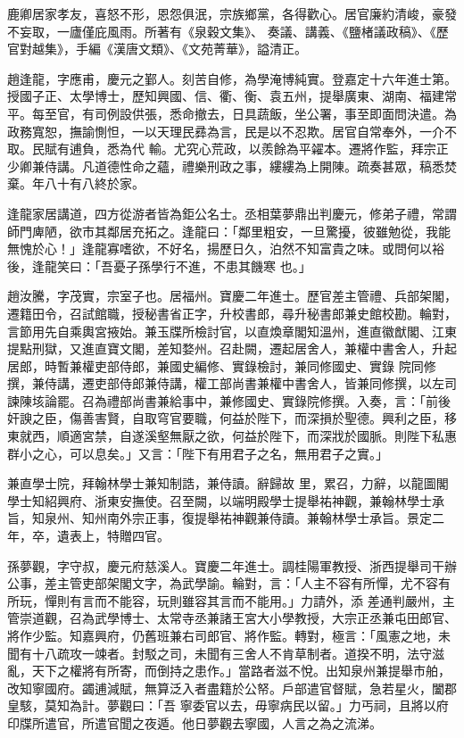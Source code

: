 \begin{pinyinscope}
 鹿卿居家孝友，喜怒不形，恩怨俱泯，宗族鄉黨，各得歡心。居官廉約清峻，豪發不妄取，一廬僅庇風雨。所著有《泉穀文集》、
 奏議、講義、《鹽楮議政稿》、《歷官對越集》，手編《漢唐文類》、《文苑菁華》，謚清正。



 趙逢龍，字應甫，慶元之鄞人。刻苦自修，為學淹博純實。登嘉定十六年進士第。授國子正、太學博士，歷知興國、信、衢、衡、袁五州，提舉廣東、湖南、福建常平。每至官，有司例設供張，悉命撤去，日具蔬飯，坐公署，事至即面問決遣。為政務寬恕，撫諭惻怛，一以天理民彞為言，民是以不忍欺。居官自常奉外，一介不取。民賦有逋負，悉為代
 輸。尤究心荒政，以羨餘為平糴本。遷將作監，拜宗正少卿兼侍講。凡道德性命之蘊，禮樂刑政之事，縷縷為上開陳。疏奏甚眾，稿悉焚棄。年八十有八終於家。



 逢龍家居講道，四方從游者皆為鉅公名士。丞相葉夢鼎出判慶元，修弟子禮，常謂師門庳陋，欲市其鄰居充拓之。逢龍曰：「鄰里粗安，一旦驚擾，彼雖勉從，我能無愧於心！」逢龍寡嗜欲，不好名，揚歷日久，泊然不知富貴之味。或問何以裕後，逢龍笑曰：「吾憂子孫學行不進，不患其饑寒
 也。」



 趙汝騰，字茂實，宗室子也。居福州。寶慶二年進士。歷官差主管禮、兵部架閣，遷籍田令，召試館職，授秘書省正字，升校書郎，尋升秘書郎兼史館校勘。輪對，言節用先自乘輿宮掖始。兼玉牒所檢討官，以直煥章閣知溫州，進直徽猷閣、江東提點刑獄，又進直寶文閣，差知婺州。召赴闕，遷起居舍人，兼權中書舍人，升起居郎，時暫兼權吏部侍郎，兼國史編修、實錄檢討，兼同修國史、實錄
 院同修撰，兼侍講，遷吏部侍郎兼侍講，權工部尚書兼權中書舍人，皆兼同修撰，以左司諫陳垓論罷。召為禮部尚書兼給事中，兼修國史、實錄院修撰。入奏，言：「前後奸諛之臣，傷善害賢，自取穹官要職，何益於陛下，而深損於聖德。興利之臣，移東就西，順適宮禁，自遂溪壑無厭之欲，何益於陛下，而深戕於國脈。則陛下私惠群小之心，可以息矣。」又言：「陛下有用君子之名，無用君子之實。」



 兼直學士院，拜翰林學士兼知制誥，兼侍讀。辭歸故
 里，累召，力辭，以龍圖閣學士知紹興府、浙東安撫使。召至闕，以端明殿學士提舉祐神觀，兼翰林學士承旨，知泉州、知州南外宗正事，復提舉祐神觀兼侍讀。兼翰林學士承旨。景定二年，卒，遺表上，特贈四官。



 孫夢觀，字守叔，慶元府慈溪人。寶慶二年進士。調桂陽軍教授、浙西提舉司干辦公事，差主管吏部架閣文字，為武學諭。輪對，言：「人主不容有所憚，尤不容有所玩，憚則有言而不能容，玩則雖容其言而不能用。」力請外，添
 差通判嚴州，主管崇道觀，召為武學博士、太常寺丞兼諸王宮大小學教授，大宗正丞兼屯田郎官、將作少監。知嘉興府，仍舊班兼右司郎官、將作監。轉對，極言：「風憲之地，未聞有十八疏攻一竦者。封駁之司，未聞有三舍人不肯草制者。道揆不明，法守滋亂，天下之權將有所寄，而倒持之患作。」當路者滋不悅。出知泉州兼提舉市舶，改知寧國府。蠲逋減賦，無算泛入者盡籍於公帑。戶部遣官督賦，急若星火，闔郡皇駭，莫知為計。夢觀曰：「吾
 寧委官以去，毋寧病民以留。」力丐祠，且將以府印牒所遣官，所遣官聞之夜遁。他日夢觀去寧國，人言之為之流涕。




\end{pinyinscope}
